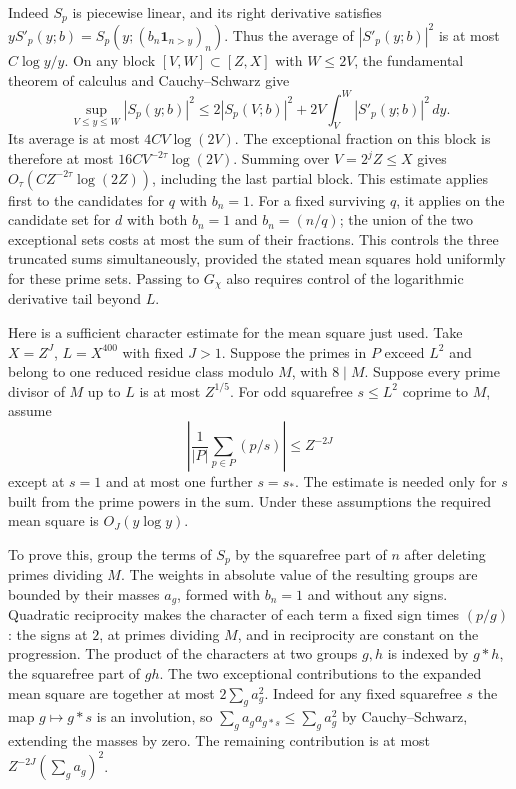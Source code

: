 \documentclass[11pt]{amsart}
\theoremstyle{definition}
\theoremstyle{remark}
\begin{document}
Indeed $S_p$ is piecewise linear, and its right derivative satisfies
$yS'_p(y;b)=S_p(y;(b_n\mathbf1_{n>y})_n)$. Thus the average of
$|S'_p(y;b)|^2$ is at most $C\log y/y$. On any block
$[V,W]\subset[Z,X]$ with $W\le2V$, the fundamental theorem of
calculus and Cauchy--Schwarz give
\[
 \sup_{V\le y\le W}|S_p(y;b)|^2
 \le 2|S_p(V;b)|^2+2V\int_V^W |S'_p(y;b)|^2\,dy .
\]
Its average is at most $4CV\log(2V)$. The exceptional fraction
on this block is therefore at most $16C V^{-2\tau}\log(2V)$.
Summing over $V=2^jZ\le X$ gives
$O_\tau(C Z^{-2\tau}\log(2Z))$, including the last partial block.
This estimate applies first to the candidates for $q$ with $b_n=1$.
For a fixed surviving $q$, it applies on the candidate set for $d$
with both $b_n=1$ and $b_n=(n/q)$; the union of the two exceptional
sets costs at most the sum of their fractions. This controls the
three truncated sums simultaneously, provided the stated mean
squares hold uniformly for these prime sets. Passing to $G_\chi$
also requires control of the logarithmic derivative tail beyond $L$.

Here is a sufficient character estimate for the mean square just used.
Take $X=Z^J$, $L=X^{400}$ with fixed $J>1$. Suppose the primes
in $P$ exceed $L^2$ and belong to one reduced residue class modulo
$M$, with $8\mid M$. Suppose every prime divisor of $M$ up to $L$
is at most $Z^{1/5}$. For odd squarefree $s\le L^2$ coprime to $M$,
assume
\[
 \left|\frac1{|P|}\sum_{p\in P}(p/s)\right|\le Z^{-2J}
\]
except at $s=1$ and at most one further $s=s_*$. The estimate is
needed only for $s$ built from the prime powers in the sum.
Under these assumptions the required mean square is $O_J(y\log y)$.

To prove this, group the terms of $S_p$ by the squarefree part of
$n$ after deleting primes dividing $M$. The weights in absolute
value of the resulting groups are bounded by their masses $a_g$,
formed with $b_n=1$ and without any signs. Quadratic reciprocity
makes the character of each term a fixed sign times $(p/g)$:
the signs at $2$, at primes dividing $M$, and in reciprocity are
constant on the progression. The product of the characters at two
groups $g,h$ is indexed by $g*h$, the squarefree part of $gh$.
The two exceptional contributions to the expanded mean square
are together at most $2\sum_g a_g^2$. Indeed for any fixed
squarefree $s$ the map $g\mapsto g*s$ is an involution, so
$\sum_g a_g a_{g*s}\le\sum_g a_g^2$ by Cauchy--Schwarz, extending
the masses by zero. The remaining contribution is at most
$Z^{-2J}(\sum_g a_g)^2$.
\end{document}
